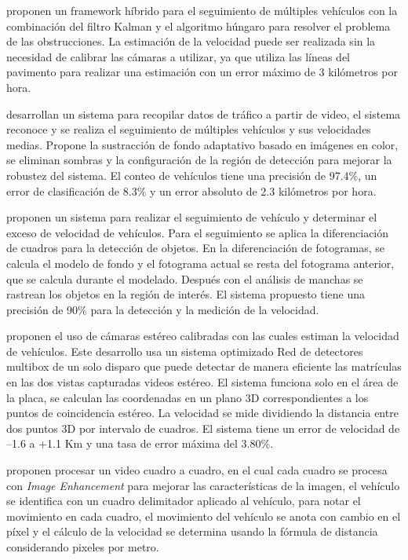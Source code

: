 \citeauthor{anil2015Real} proponen un framework híbrido para el seguimiento de múltiples vehículos con la combinación del filtro Kalman y el algoritmo húngaro para resolver el problema de las obstrucciones. La estimación de la velocidad puede ser realizada sin la necesidad de calibrar las cámaras a utilizar, ya que utiliza las líneas del pavimento para realizar una estimación con un error máximo de 3 kilómetros por hora.


\citeauthor{li2014Video} desarrollan un sistema para recopilar datos de tráfico a partir de video, el sistema reconoce y se realiza el seguimiento de múltiples vehículos y sus velocidades medias. Propone la sustracción de fondo adaptativo basado en imágenes en color, se eliminan sombras y la configuración de la región de detección para mejorar la robustez del sistema. El conteo de vehículos tiene una precisión de 97.4\%, un error de clasificación de 8.3\% y un error absoluto de 2.3 kilómetros por hora.


\citeauthor{khan2019Multiple} proponen un sistema para realizar el seguimiento de vehículo y determinar el exceso de velocidad de vehículos. Para el seguimiento se aplica la diferenciación de cuadros para la detección de objetos. En la diferenciación de fotogramas, se calcula el modelo de fondo y el fotograma actual se resta del fotograma anterior, que se calcula durante el modelado. Después con el análisis de manchas se rastrean los objetos en la región de interés. El sistema propuesto tiene una precisión de 90\% para la detección y la medición de la velocidad.


\citeauthor{yang2019Vehicle} proponen el uso de cámaras estéreo calibradas con las cuales estiman la velocidad de vehículos. Este desarrollo usa un sistema optimizado Red de detectores multibox de un solo disparo que puede detectar de manera eficiente las matrículas en las dos vistas capturadas videos estéreo. El sistema funciona solo en el área de la placa, se calculan las coordenadas en un plano 3D correspondientes a los puntos de coincidencia estéreo. La velocidad se mide dividiendo la distancia entre dos puntos 3D por intervalo de cuadros. El sistema tiene un error de velocidad de –1.6 a +1.1 Km y una tasa de error máxima del 3.80\%.


\citeauthor{kamoji2020Image} proponen procesar un video cuadro a cuadro, en el cual cada cuadro se procesa con \textit{Image Enhancement} para mejorar las características de la imagen, el vehículo se identifica con un cuadro delimitador aplicado al vehículo, para notar el movimiento en cada cuadro, el movimiento del vehículo se anota con cambio en el píxel y el cálculo de la velocidad se determina usando la fórmula de distancia considerando pixeles por metro.



